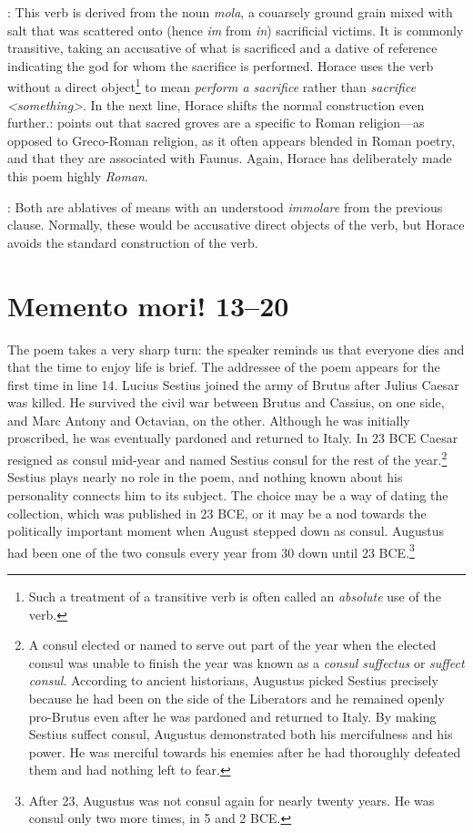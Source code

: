 
: This verb is derived from the noun \textit{mola}, a couarsely ground grain mixed with salt that was scattered onto (hence \textit{im} from \textit{in}) sacrificial victims.  It is commonly transitive, taking an accusative of what is sacrificed and a dative of reference indicating the god for whom the sacrifice is performed.  Horace uses the verb without a direct object\footnote{Such a treatment of a transitive verb is often called an \textit{absolute} use of the verb.} to mean \textit{perform a sacrifice} rather than \textit{sacrifice <something>}.  In the next line, Horace shifts the normal construction even further.\indent{}: \citet[82]{mayer2012} points out that sacred groves are a specific  to Roman religion---as opposed to Greco-Roman religion, as it often appears blended in Roman poetry, and that they are associated with Faunus.  Again, Horace has deliberately made this poem highly \textit{Roman}.

: Both are ablatives of means with an understood \textit{immolare} from the previous clause.  Normally, these would be accusative direct objects of the verb, but Horace avoids the standard construction of the verb.

\section*{Memento mori! 13--20}

The poem takes a very sharp turn: the speaker reminds us that everyone dies and that the time to enjoy life is brief.  The addressee of the poem appears for the first time in line 14.  Lucius Sestius joined the army of Brutus after Julius Caesar was killed.  He survived the civil war between Brutus and Cassius, on one side, and Marc Antony and Octavian, on the other.  Although he was initially proscribed, he was eventually pardoned and returned to Italy.  In 23 BCE Caesar resigned as consul mid-year and named Sestius consul for the rest of the year.\footnote{A consul elected or named to serve out part of the year when the elected consul was unable to finish the year was known as a \textit{consul suffectus} or \textit{suffect consul}.  According to ancient historians, Augustus picked Sestius precisely because he had been on the side of the Liberators and he remained openly pro-Brutus even after he was pardoned and returned to Italy.  By making Sestius suffect consul, Augustus demonstrated both his mercifulness and his power.  He was merciful towards his enemies after he had thoroughly defeated them and had nothing left to fear.}  Sestius plays nearly no role in the poem, and nothing known about his personality connects him to its subject.  The choice may be a way of dating the collection, which was published in 23 BCE, or it may be a nod towards the politically important moment when August stepped down as consul.  Augustus had been one of the two consuls every year from 30 down until 23 BCE.\footnote{After 23, Augustus was not consul again for nearly twenty years.  He was consul only two more times, in 5 and 2 BCE.}

